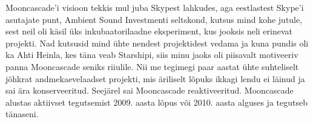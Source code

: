 Mooncascade'i visioon tekkis mul juba Skypest lahkudes, aga 
eestlastest Skype'i asutajate punt, Ambient Sound 
Investmenti seltskond, kutsus mind kohe jutule, sest neil oli 
käsil üks inkubaatorilaadne eksperiment, kus jooksis neli 
erinevat projekti. Nad kutsusid mind ühte nendest projektidest vedama 
ja kuna pundis oli ka Ahti Heinla, kes 
täna veab Starshipi, siis minu jaoks oli piisavalt motiveeriv panna Mooncascade seniks riiulile. Nii me tegimegi paar aastat 
ühte suhteliselt jõhkrat andmekaevelaadset projekti, mis äriliselt 
lõpuks ikkagi lendu ei läinud ja sai ära konserveeritud. Seejärel sai Mooncascade 
reaktiveeritud. Mooncascade alustas aktiivset tegutsemist 2009. aasta lõpus või 2010. aasta 
alguses ja tegutseb tänaseni. 
